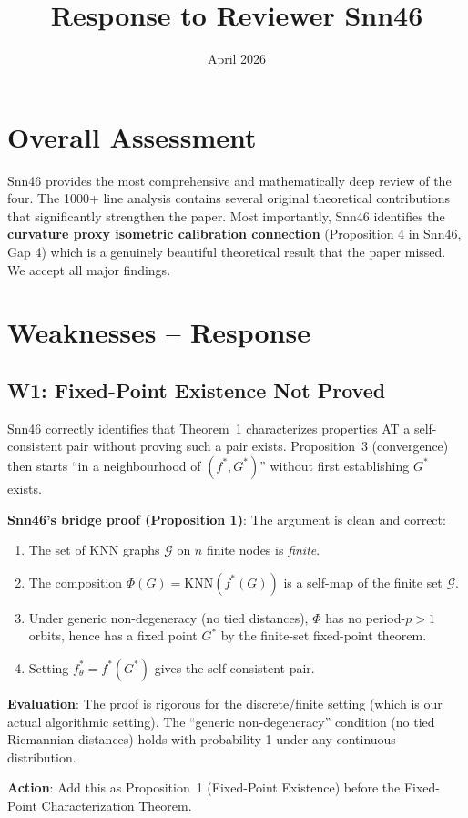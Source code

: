 \documentclass{article}
\title{Response to Reviewer Snn46}
\date{April 2026}
\begin{document}
\maketitle

\section{Overall Assessment}

Snn46 provides the most comprehensive and mathematically deep review of the
four. The 1000+ line analysis contains several original theoretical contributions
that significantly strengthen the paper. Most importantly, Snn46 identifies the
\textbf{curvature proxy isometric calibration connection} (Proposition 4 in
Snn46, Gap 4) which is a genuinely beautiful theoretical result that the paper
missed. We accept all major findings.

\section{Weaknesses -- Response}

\subsection{W1: Fixed-Point Existence Not Proved}

\begin{accept}
Snn46 correctly identifies that Theorem~1 characterizes properties AT a
self-consistent pair without proving such a pair exists. Proposition~3
(convergence) then starts ``in a neighbourhood of $(f^*, G^*)$'' without
first establishing $G^*$ exists.

\textbf{Snn46's bridge proof (Proposition 1)}: The argument is clean and correct:
\begin{enumerate}
  \item The set of KNN graphs $\mathcal{G}$ on $n$ finite nodes is \emph{finite}.
  \item The composition $\Phi(G) = \mathrm{KNN}(f^*(G))$ is a self-map of
    the finite set $\mathcal{G}$.
  \item Under generic non-degeneracy (no tied distances), $\Phi$ has no
    period-$p>1$ orbits, hence has a fixed point $G^*$ by the finite-set
    fixed-point theorem.
  \item Setting $f_\theta^* = f^*(G^*)$ gives the self-consistent pair.
\end{enumerate}

\textbf{Evaluation}: The proof is rigorous for the discrete/finite setting
(which is our actual algorithmic setting). The ``generic non-degeneracy''
condition (no tied Riemannian distances) holds with probability 1 under
any continuous distribution.

\textbf{Action}: Add this as Proposition~1 (Fixed-Point Existence) before
the Fixed-Point Characterization Theorem.
\end{accept}
\end{document}
